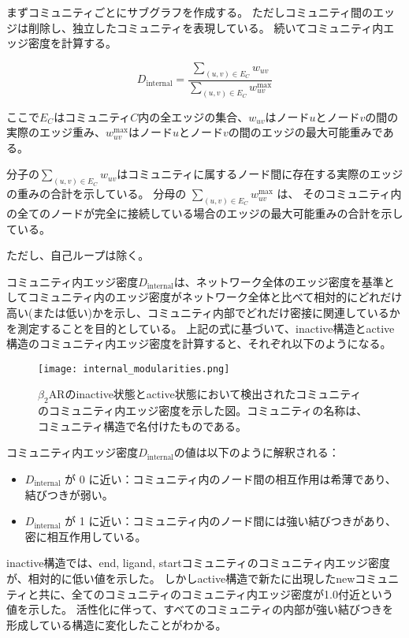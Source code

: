まずコミュニティごとにサブグラフを作成する。
ただしコミュニティ間のエッジは削除し、独立したコミュニティを表現している。
続いてコミュニティ内エッジ密度を計算する。

\[
D_{\text{internal}} = \frac{\sum_{(u,v) \in E_C} w_{uv}}{\sum_{(u,v) \in E_C} w_{uv}^{\text{max}}}
\label{eq:internal_density}
\]

ここで$E_C$はコミュニティ$C$内の全エッジの集合、$w_{uv}$はノード$u$とノード$v$の間の実際のエッジ重み、$w_{uv}^{\text{max}}$はノード$u$とノード$v$の間のエッジの最大可能重みである。

分子の\(\sum_{(u,v) \in E_C} w_{uv}\)はコミュニティに属するノード間に存在する実際のエッジの重みの合計を示している。
分母の \(\sum_{(u,v) \in E_C} w_{uv}^{\text{max}}\) は、
そのコミュニティ内の全てのノードが完全に接続している場合のエッジの最大可能重みの合計を示している。

ただし、自己ループは除く。


コミュニティ内エッジ密度$D_{\text{internal}}$は、ネットワーク全体のエッジ密度を基準としてコミュニティ内のエッジ密度がネットワーク全体と比べて相対的にどれだけ高い(または低い)かを示し、コミュニティ内部でどれだけ密接に関連しているかを測定することを目的としている。
上記の式に基づいて、inactive構造とactive構造のコミュニティ内エッジ密度を計算すると、それぞれ以下のようになる。

\begin{figure}[htbp]
    \centering
    \texttt{[image: internal\_modularities.png]}
    \caption{$\beta_2$ARのinactive状態とactive状態において検出されたコミュニティのコミュニティ内エッジ密度を示した図。コミュニティの名称は、コミュニティ構造で名付けたものである。}
    \label{fig:internal}
\end{figure}

\newpage

コミュニティ内エッジ密度$D_{\text{internal}}$の値は以下のように解釈される：
\begin{itemize}
    \item \( D_{\text{internal}} \) が 0 に近い：コミュニティ内のノード間の相互作用は希薄であり、結びつきが弱い。
    \item \( D_{\text{internal}} \) が 1 に近い：コミュニティ内のノード間には強い結びつきがあり、密に相互作用している。
\end{itemize}

inactive構造では、end, ligand, startコミュニティのコミュニティ内エッジ密度が、相対的に低い値を示した。
しかしactive構造で新たに出現したnewコミュニティと共に、全てのコミュニティのコミュニティ内エッジ密度が1.0付近という値を示した。
活性化に伴って、すべてのコミュニティの内部が強い結びつきを形成している構造に変化したことがわかる。

